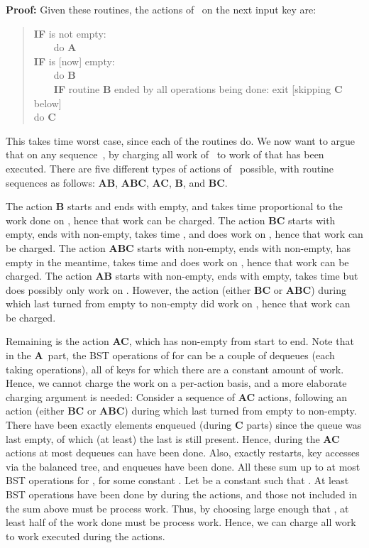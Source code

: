 \documentclass[11pt]{article}
\newenvironment{proof}{\noindent\textbf{Proof: }\ignorespaces}
  {\hspace*{\fill}\medskip}
\begin{document}
\begin{proof}
Given these routines, the actions of~ on the next input key are:
\begin{quote}
\textbf{IF}  is not empty:\\
\mbox{}~~~~do \textbf{A}\\
\textbf{IF}  is [now] empty:\\
\mbox{}~~~~do \textbf{B}\\
\mbox{}~~~~\textbf{IF} routine \textbf{B} ended by all operations being
done: exit [skipping \textbf{C} below]\\
do \textbf{C}
\end{quote}

This takes  time worst case, since each of the routines
do. We now want to argue that  on any
sequence~, by charging all work of~ to work of  that has
been executed. There are five different types of actions of~
possible, with routine sequences as follows: \textbf{AB}, \textbf{ABC},
\textbf{AC}, \textbf{B}, and \textbf{BC}.

The action \textbf{B} starts and ends with  empty, and takes time
proportional to the work done on , hence that work can be charged.
The action \textbf{BC} starts with  empty, ends with  non-empty,
takes time , and does  work on , hence that work
can be charged.
The action \textbf{ABC} starts with  non-empty, ends with 
non-empty, has  empty in the meantime, takes time  and
does  work on , hence that work can be charged.
The action \textbf{AB} starts with  non-empty, ends with  empty,
takes time  but does possibly only  work on
. However, the action (either \textbf{BC} or \textbf{ABC}) during
which  last turned from empty to non-empty did  work on ,
hence that work can be charged.

Remaining is the action \textbf{AC}, which has  non-empty from start
to end. Note that in the \textbf{A}~part, the  BST
operations of  for  can be a couple of dequeues
(each taking  operations), all of keys for which there are a
constant amount of  work. Hence, we cannot charge the  work on a
per-action basis, and a more elaborate charging argument is needed:
Consider a sequence of  \textbf{AC} actions, following an action
(either \textbf{BC} or \textbf{ABC}) during which  last turned from
empty to non-empty. There have been exactly  elements enqueued
(during \textbf{C} parts) since the queue was last empty, of which (at
least) the last is still present. Hence, during the  \textbf{AC}
actions at most  dequeues can have been done. Also, exactly 
restarts,  key accesses via the balanced tree, and  enqueues have
been done. All these sum up to at most  BST operations
for , for some constant . Let  be a constant such that
. At least  BST operations have been done by  during the
 actions, and those not included in the sum above must be 
process work. Thus, by choosing  large enough that , at least half of the work done must be  process work. Hence, we
can charge all  work to  work executed during the  actions.


\end{proof}
\end{document}
